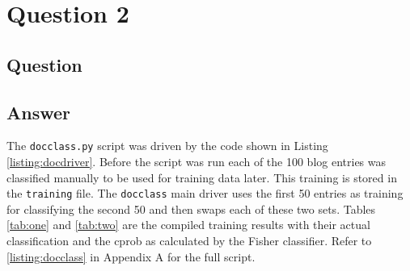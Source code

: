 \section{Question 2}

\subsection{Question}


\subsection{Answer}

The {\tt docclass.py} script was driven by the code shown in Listing \ref{listing:docdriver}. Before the script was run each of the 100 blog entries was classified manually to be used for training data later. This training is stored in the {\tt training} file. The {\tt docclass} main driver uses the first 50 entries as training for classifying the second 50 and then swaps each of these two sets. Tables \ref{tab:one} and \ref{tab:two} are the compiled training results with their actual classification and the cprob as calculated by the Fisher classifier. Refer to \ref{listing:docclass} in Appendix A for the full script.

\clearpage



\clearpage

